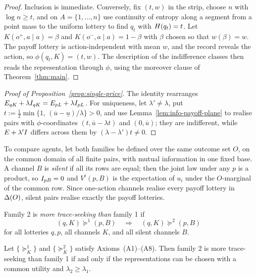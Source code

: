\begin{proof}
Inclusion is immediate.  Conversely, fix $(t,w)$ in the strip, choose $n$ with $\log n\ge t$, and on
$A=\{1,\dots,n\}$ use continuity of entropy along a segment from a point mass to the uniform lottery to find
$q_t$ with $H(q_t)=t$.  Let $K(o^+,a\mid a)=\beta$ and $K(o^-,a\mid a)=1-\beta$ with $\beta$ chosen so that
$w(\beta)=w$.  The payoff lottery is action-independent with mean $w$, and the record reveals the action, so
$\phi(q_t,K)=(t,w)$.  The description of the indifference classes then reads the representation through $\phi$,
using the moreover clause of Theorem~\ref{thm:main}.
\end{proof}

\begin{proof}[Proof of Proposition~\ref{prop:single-price}]
The identity rearranges $E_{qK}+\lambda I_{qK}=E_{pL}+\lambda I_{pL}$.  For uniqueness, let
$\lambda'\ne\lambda$, put $t:=\tfrac12\min\{1,\,(\overline u-\underline u)/\lambda\}>0$, and use
Lemma~\ref{lem:info-payoff-plane} to realise pairs with $\phi$-coordinates $(t,\overline u-\lambda t)$ and
$(0,\overline u)$; they are indifferent, while $E+\lambda'I$ differs across them by $(\lambda-\lambda')t\ne0$.
\end{proof}

To compare agents, let both families be defined over the same outcome set $O$, on the common domain of all finite
pairs, with mutual information in one fixed base.  A
channel $B$ is \emph{silent} if all its rows are equal; then the joint law under any $p$ is a product, so
$I_{pB}=0$ and $V^i(p,B)$ is the expectation of $u_i$ under the $O$-marginal of the common row.  Since
one-action channels realise every payoff lottery in $\Delta(O)$, silent pairs realise exactly the payoff lotteries.

\begin{definition}
Family 2 is \emph{more trace-seeking than} family 1 if
\[
 (q,K)\succeq^1(p,B)\quad\Longrightarrow\quad(q,K)\succeq^2(p,B)
\]
for all lotteries $q,p$, all channels $K$, and all silent channels $B$.
\end{definition}

\begin{proposition}\label{prop:comparative}
Let $\{\succeq^1_K\}$ and $\{\succeq^2_K\}$ satisfy Axioms~\textup{(A1)--(A8)}.  Then family 2 is more
trace-seeking than family 1 if and only if the representations can be chosen with a common utility and
$\lambda_2\ge\lambda_1$.
\end{proposition}

